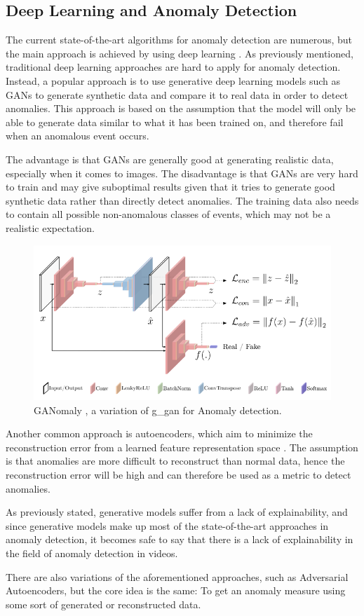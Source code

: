 \subsection{Deep Learning and Anomaly Detection}
\label{sec:dl_anom_detection}
The current state-of-the-art algorithms for anomaly detection are numerous, but the main approach is achieved by using deep learning \cite{anomaly_detection}. As previously mentioned, traditional deep learning approaches are hard to apply for anomaly detection. Instead, a popular approach is to use generative deep learning models such as GANs \cite{anomaly_detection, ganomaly,anomalyvideo} to generate synthetic data and compare it to real data in order to detect anomalies. This approach is based on the assumption that the model will only be able to generate data similar to what it has been trained on, and therefore fail when an anomalous event occurs.
\par The advantage is that GANs are generally good at generating realistic data, especially when it comes to images. The disadvantage is that GANs are very hard to train and may give suboptimal results given that it tries to generate good synthetic data rather than directly detect anomalies. The training data also needs to contain all possible non-anomalous classes of events, which may not be a realistic expectation.
\par
\begin{figure}[H]
    \centering
    \includegraphics[width=\linewidth]{resources/models/ganomaly.png}
    \caption{GANomaly \cite{ganomaly}, a variation of \gls*{g_gan} for Anomaly detection.}
    \label{fig:ganomaly}
\end{figure}
Another common approach is autoencoders, which aim to minimize the reconstruction error from a learned feature representation space \cite{autoencoder1,anomaly_detection,anomalyvideo}. The assumption is that anomalies are more difficult to reconstruct than normal data, hence the reconstruction error will be high and can therefore be used as a metric to detect anomalies.
\par
As previously stated, generative models suffer from a lack of explainability, and since generative models make up most of the state-of-the-art approaches in anomaly detection, it becomes safe to say that there is a lack of explainability in the field of anomaly detection in videos.
\par
There are also variations of the aforementioned approaches, such as Adversarial Autoencoders, but the core idea is the same: To get an anomaly measure using some sort of generated or reconstructed data.
